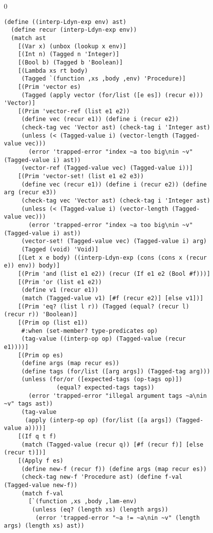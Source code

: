 \documentclass[7x10]{TimesAPriori_MIT}%
\def\racketEd{0}
\def\edition{1}
\numberwithin{theorem}{chapter}
\numberwithin{definition}{chapter}
\numberwithin{equation}{chapter}
\begin{document}
\begin{figure}[tbp]
  \begin{tcolorbox}[colback=white]
    {\if\edition\racketEd
\begin{lstlisting}[basicstyle=\ttfamily\footnotesize]
(define ((interp-Ldyn-exp env) ast)
  (define recur (interp-Ldyn-exp env))
  (match ast
    [(Var x) (unbox (lookup x env)]
    [(Int n) (Tagged n 'Integer)]
    [(Bool b) (Tagged b 'Boolean)]
    [(Lambda xs rt body)
     (Tagged `(function ,xs ,body ,env) 'Procedure)]
    [(Prim 'vector es)
     (Tagged (apply vector (for/list ([e es]) (recur e))) 'Vector)]
    [(Prim 'vector-ref (list e1 e2))
     (define vec (recur e1)) (define i (recur e2))
     (check-tag vec 'Vector ast) (check-tag i 'Integer ast)
     (unless (< (Tagged-value i) (vector-length (Tagged-value vec)))
       (error 'trapped-error "index ~a too big\nin ~v" (Tagged-value i) ast))
     (vector-ref (Tagged-value vec) (Tagged-value i))]
    [(Prim 'vector-set! (list e1 e2 e3))
     (define vec (recur e1)) (define i (recur e2)) (define arg (recur e3))
     (check-tag vec 'Vector ast) (check-tag i 'Integer ast)
     (unless (< (Tagged-value i) (vector-length (Tagged-value vec)))
       (error 'trapped-error "index ~a too big\nin ~v" (Tagged-value i) ast))
     (vector-set! (Tagged-value vec) (Tagged-value i) arg)
     (Tagged (void) 'Void)]
    [(Let x e body) ((interp-Ldyn-exp (cons (cons x (recur e)) env)) body)]
    [(Prim 'and (list e1 e2)) (recur (If e1 e2 (Bool #f)))]
    [(Prim 'or (list e1 e2))
     (define v1 (recur e1))
     (match (Tagged-value v1) [#f (recur e2)] [else v1])]
    [(Prim 'eq? (list l r)) (Tagged (equal? (recur l) (recur r)) 'Boolean)]
    [(Prim op (list e1))
     #:when (set-member? type-predicates op)
     (tag-value ((interp-op op) (Tagged-value (recur e1))))]
    [(Prim op es)
     (define args (map recur es))
     (define tags (for/list ([arg args]) (Tagged-tag arg)))
     (unless (for/or ([expected-tags (op-tags op)])
               (equal? expected-tags tags))
       (error 'trapped-error "illegal argument tags ~a\nin ~v" tags ast))
     (tag-value
      (apply (interp-op op) (for/list ([a args]) (Tagged-value a))))]
    [(If q t f)
     (match (Tagged-value (recur q)) [#f (recur f)] [else (recur t)])]
    [(Apply f es)
     (define new-f (recur f)) (define args (map recur es))
     (check-tag new-f 'Procedure ast) (define f-val (Tagged-value new-f))
     (match f-val 
       [`(function ,xs ,body ,lam-env)
        (unless (eq? (length xs) (length args))
         (error 'trapped-error "~a != ~a\nin ~v" (length args) (length xs) ast))

\end{lstlisting}}
\end{tcolorbox}
\end{figure}
\end{document}
